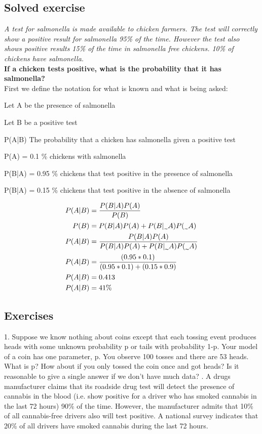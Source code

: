 \subsection{Solved exercise}
\textit{A test for salmonella is made available to chicken farmers. The test will correctly show a positive result for salmonella 95\% of the time. However the test also shows positive results 15\% of the time in salmonella free chickens. 10\% of chickens have salmonella.} \\
\textbf{If a chicken tests positive, what is the probability that it has salmonella?} \\
First we define the notation for what is known and what is being asked:\\
\setlength{\parindent}{10ex} \par
Let A be the presence of salmonella \par
Let B be a positive test \par
P(A|B) The probability that a chicken has salmonella given a positive test \par
P(A) = 0.1 \% chickens with salmonella \par
P(B|A) = 0.95 \% chickens that test positive in the presence of salmonella \par
P(B|\midtilde A) = 0.15 \% chickens that test positive in the absence of salmonella \par
\noindent
\begin{align*}
    P(A|B) & = \frac{P(B|A)P(A)}{P(B)} \\
    P(B) & = P(B|A)P(A) + P(B|\midtilde A)P(\midtilde A)\\
    P(A|B) & = \frac{P(B|A)P(A)}{P(B|A)P(A) + P(B|\midtilde A)P(\midtilde A)} \\
    P(A|B) & = \frac{(0.95*0.1)}{(0.95*0.1)+(0.15*0.9)} \\
    P(A|B) & = 0.413 \\
    P(A|B) & = 41\% \\
\end{align*}
\subsection{Exercises}
1. Suppose we know nothing about coins except that each tossing event produces heads with some unknown probability p or tails with probability 1-p. Your model of a coin has one parameter, p. You observe 100 tosses and there are 53 heads. What is p? How about if you only tossed the coin once and got heads? Is it reasonable to give a single answer if we don’t have much data? 
. A drugs manufacturer claims that its roadside drug test will detect the presence of cannabis in the blood (i.e. show positive for a driver who has smoked cannabis in the last 72 hours) 90\% of the time. However, the manufacturer admits that 10\% of all cannabis-free drivers also will test positive. A national survey indicates that 20\% of all drivers have smoked cannabis during the last 72 hours. \\